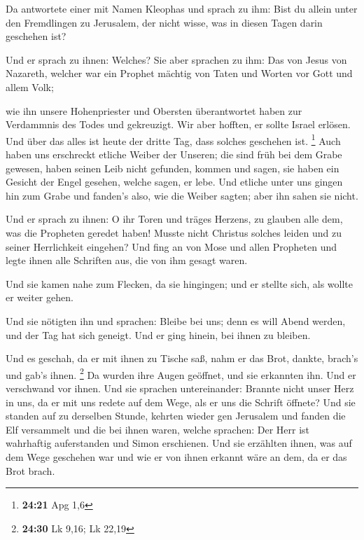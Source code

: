  Da antwortete einer mit Namen Kleophas und sprach zu
ihm: Bist du allein unter den Fremdlingen zu Jerusalem, der nicht wisse,
was in diesen Tagen darin geschehen ist?

 Und er sprach zu ihnen: Welches? Sie aber sprachen zu
ihm: Das von Jesus von Nazareth, welcher war ein Prophet mächtig von
Taten und Worten vor Gott und allem Volk;

 wie ihn unsere Hohenpriester und Obersten überantwortet
haben zur Verdammnis des Todes und gekreuzigt.  Wir aber
hofften, er sollte Israel erlösen. Und über das alles ist heute der
dritte Tag, dass solches geschehen ist. \footnote{\textbf{24:21} Apg 1,6}
 Auch haben uns erschreckt etliche Weiber der Unseren;
die sind früh bei dem Grabe gewesen,  haben seinen Leib
nicht gefunden, kommen und sagen, sie haben ein Gesicht der Engel
gesehen, welche sagen, er lebe.  Und etliche unter uns
gingen hin zum Grabe und fanden's also, wie die Weiber sagten; aber ihn
sahen sie nicht.

 Und er sprach zu ihnen: O ihr Toren und träges Herzens,
zu glauben alle dem, was die Propheten geredet haben! 
Musste nicht Christus solches leiden und zu seiner Herrlichkeit
eingehen?  Und fing an von Mose und allen Propheten und
legte ihnen alle Schriften aus, die von ihm gesagt waren.

 Und sie kamen nahe zum Flecken, da sie hingingen; und er
stellte sich, als wollte er weiter gehen.

 Und sie nötigten ihn und sprachen: Bleibe bei uns; denn
es will Abend werden, und der Tag hat sich geneigt. Und er ging hinein,
bei ihnen zu bleiben.

 Und es geschah, da er mit ihnen zu Tische saß, nahm er
das Brot, dankte, brach's und gab's ihnen. \footnote{\textbf{24:30} Lk
  9,16; Lk 22,19}  Da wurden ihre Augen geöffnet, und sie
erkannten ihn. Und er verschwand vor ihnen.  Und sie
sprachen untereinander: Brannte nicht unser Herz in uns, da er mit uns
redete auf dem Wege, als er uns die Schrift öffnete?  Und
sie standen auf zu derselben Stunde, kehrten wieder gen Jerusalem und
fanden die Elf versammelt und die bei ihnen waren, 
welche sprachen: Der Herr ist wahrhaftig auferstanden und Simon
erschienen.  Und sie erzählten ihnen, was auf dem Wege
geschehen war und wie er von ihnen erkannt wäre an dem, da er das Brot
brach.

